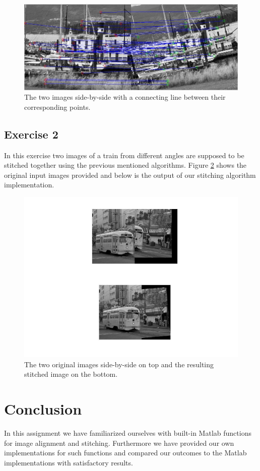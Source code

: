 \documentclass[11pt]{article}
\begin{document}
\begin{figure}[h!]
\begin{flushleft}
\includegraphics[scale=0.7]{side_by_side.jpg}
\caption{The two images side-by-side with a connecting line between their corresponding points.}
\label{side_by_side}
\end{flushleft}
\end{figure}

\subsection{Exercise 2}
In this exercise two images of a train from different angles are supposed to be stitched together using the previous mentioned algorithms. Figure \ref{stitched} shows the original input images provided and below is the output of our stitching algorithm implementation.

\begin{figure}[h!]
\begin{flushleft}
\includegraphics[scale=0.4]{stich.jpg}
\caption{The two original images side-by-side on top and the resulting stitched image on the bottom.}
\label{stitched}
\end{flushleft}
\end{figure}

\section{Conclusion}
In this assignment we have familiarized ourselves with built-in Matlab functions for image alignment and stitching. Furthermore we have provided our own implementations for such functions and compared our outcomes to the Matlab implementations with satisfactory results.
\end{document}

